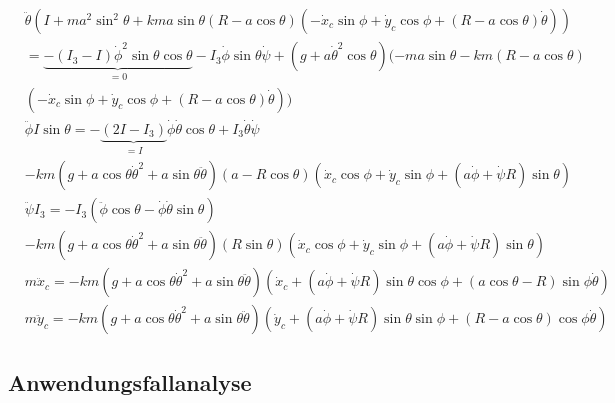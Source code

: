 {\begin{align*}
	&
	\ddot \theta (I+ma^2\sin^2\theta+kma\sin \theta(R-a\cos\theta)(-\dot x_c
	\sin\phi+\dot y_c \cos \phi+(R-a\cos\theta)\dot \theta))
	\\&
	=\underbrace{-(I_3-I)\dot \phi^2\sin\theta\cos\theta}_{=0}-I_3\dot \phi \sin \theta \dot \psi 
	+ (g+a\dot \theta^2\cos \theta)(-ma\sin\theta - km(R-a\cos \theta)
	\\&
	(-\dot x_c \sin \phi +\dot y_c \cos \phi+(R-a\cos\theta)\dot \theta))
\end{align*}
\begin{align*}
	&
	\ddot \phi I \sin\theta= -\underbrace{(2I-I_3)}_{=I}
	\dot \phi \dot \theta \cos \theta + I_3\dot \theta \dot \psi
	\\&
	-km(g+a\cos\theta\dot\theta^2+a\sin\theta\ddot\theta)
	(a-R\cos\theta)(\dot x_c\cos \phi +\dot y_c \sin\phi+
	(a\dot \phi+\dot \psi R)\sin \theta)
\end{align*}
\begin{align*}
	&\ddot \psi I_3=-I_3(\ddot \phi \cos \theta - \dot \phi \dot \theta \sin \theta)
	\\&
	-km(g+a\cos\theta\dot\theta^2+a \sin\theta\ddot \theta)(R\sin\theta)
	(\dot x_c\cos \phi +\dot y_c \sin \phi+(a\dot \phi +\dot \psi R)\sin\theta)
\end{align*}
\begin{align*}
	&m\ddot x_c=-km(g+a\cos\theta\dot \theta^2+a\sin \theta\ddot\theta)
	(\dot x_c+(a\dot \phi + \dot \psi R)\sin \theta\cos \phi+
	(a\cos \theta -R)\sin \phi \dot \theta)
\end{align*}
\begin{align*}
	&m\ddot y_c=-km(g+a\cos \theta\dot \theta^2+a \sin \theta \ddot \theta)
	(\dot y_c+(a\dot \phi + \dot \psi R)\sin \theta \sin \phi
	+(R-a\cos \theta)\cos\phi \dot \theta)
\end{align*}


\subsection{Anwendungsfallanalyse}
}
